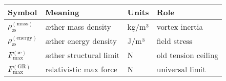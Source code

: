 \begin{table}
    \centering
    \begin{tabular}{llll}
        \toprule
        \textbf{Symbol} & \textbf{Meaning} & \textbf{Units} & \textbf{Role} \\
        \midrule
        $\rho_{\text{æ}}^{(\mathrm{mass})}$ & æther mass density & kg/m³ & vortex inertia \\
        $\rho_{\text{æ}}^{(\mathrm{energy})}$& æther energy density & J/m³ & field stress \\
        $F_{\max}^{(\text{æ})}$             & æther structural limit & N & old tension ceiling \\
        $F_{\max}^{(\mathrm{GR})}$         & relativistic max force & N & universal limit \\
        \bottomrule
    \end{tabular}
    \caption{}
    \label{tab:}
\end{table}


    \medskip

